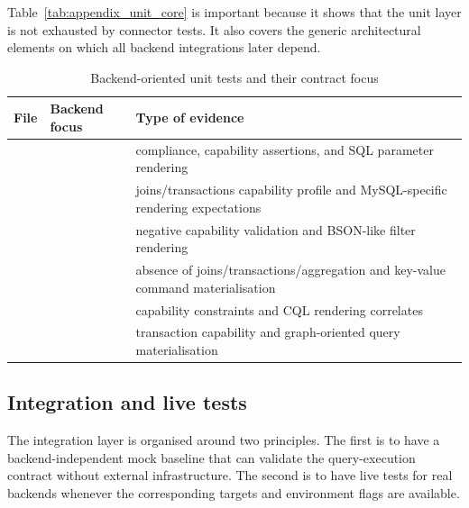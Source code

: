 Table~\ref{tab:appendix_unit_core} is important because it shows that the unit layer is not exhausted by connector tests. It also covers the generic architectural elements on which all backend integrations later depend.

\begin{table}[H]
\centering
\small
\caption{Backend-oriented unit tests and their contract focus}
\label{tab:appendix_unit_connectors}
\begin{tabularx}{\textwidth}{L{3.4cm}L{3.3cm}Z}
\toprule
\textbf{File} & \textbf{Backend focus} & \textbf{Type of evidence} \\
\midrule
{} &  &  compliance, capability assertions, and SQL parameter rendering \\
 &  & joins/transactions capability profile and MySQL-specific rendering expectations \\
 &  & negative capability validation and BSON-like filter rendering \\
 &  & absence of joins/transactions/aggregation and key-value command materialisation \\
 &  & capability constraints and CQL rendering correlates \\
 &  & transaction capability and graph-oriented query materialisation \\
\bottomrule
\end{tabularx}
\end{table}

\subsection{Integration and live tests}

The integration layer is organised around two principles. The first is to have a backend-independent mock baseline that can validate the query-execution contract without external infrastructure. The second is to have live tests for real backends whenever the corresponding targets and environment flags are available.

